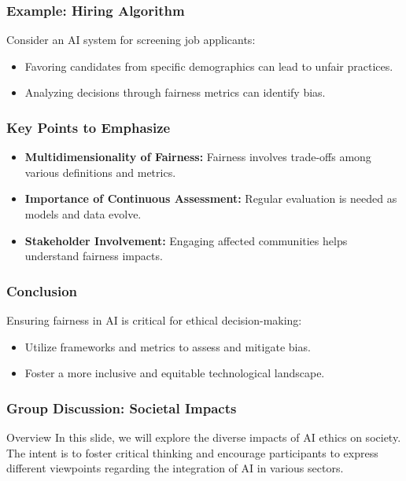 \documentclass[aspectratio=169]{beamer}
\begin{document}
\begin{frame}[fragile]
    \frametitle{Example: Hiring Algorithm}
    Consider an AI system for screening job applicants:
    \begin{itemize}
        \item Favoring candidates from specific demographics can lead to unfair practices.
        \item Analyzing decisions through fairness metrics can identify bias.
    \end{itemize}
\end{frame}

\begin{frame}[fragile]
    \frametitle{Key Points to Emphasize}
    \begin{itemize}
        \item \textbf{Multidimensionality of Fairness:} 
            Fairness involves trade-offs among various definitions and metrics.
        \item \textbf{Importance of Continuous Assessment:} 
            Regular evaluation is needed as models and data evolve.
        \item \textbf{Stakeholder Involvement:} 
            Engaging affected communities helps understand fairness impacts.
    \end{itemize}
\end{frame}

\begin{frame}[fragile]
    \frametitle{Conclusion}
    Ensuring fairness in AI is critical for ethical decision-making:
    \begin{itemize}
        \item Utilize frameworks and metrics to assess and mitigate bias.
        \item Foster a more inclusive and equitable technological landscape.
    \end{itemize}
\end{frame}

\begin{frame}[fragile]
    \frametitle{Group Discussion: Societal Impacts}
    \begin{block}{Overview}
        In this slide, we will explore the diverse impacts of AI ethics on society. 
        The intent is to foster critical thinking and encourage participants to express 
        different viewpoints regarding the integration of AI in various sectors.
    \end{block}
\end{frame}
\end{document}
